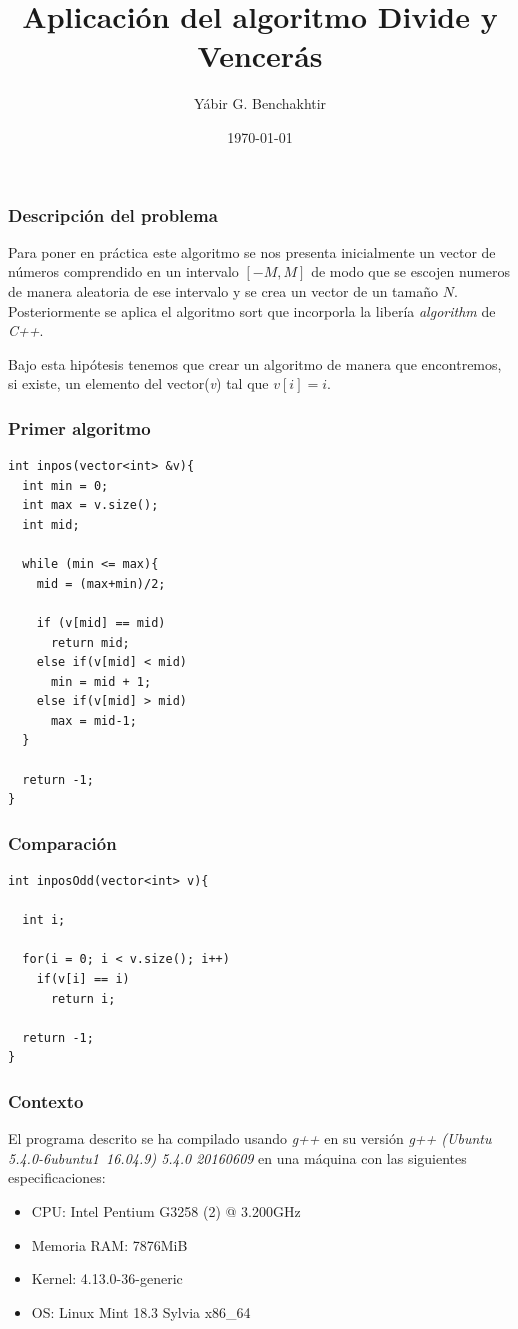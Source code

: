 \documentclass[spanish]{beamer}
\title{Aplicación del algoritmo Divide y Vencerás}
\date{\today}
\author{Yábir G. Benchakhtir}
\institute{Doble Grado en Ingeniería Informática y Matemáticas}
\begin{document}
\frame{\titlepage}

\begin{frame}\frametitle{Descripción del problema}

  Para poner en práctica este algoritmo se nos presenta inicialmente un
  vector de números comprendido en un intervalo $[-M, M]$ de modo que se
  escojen numeros de manera aleatoria de ese intervalo y se crea un
  vector de un tamaño $N$. Posteriormente se aplica el algoritmo sort
  que incorporla la libería \textit{algorithm} de \textit{C++}.

  Bajo esta hipótesis tenemos que crear un algoritmo de manera que
  encontremos, si existe, un elemento del vector(\textit{v}) tal que
  $v[i] = i$.

  
\end{frame}

\begin{frame}[fragile]\frametitle{Primer algoritmo}
\begin{lstlisting}
int inpos(vector<int> &v){
  int min = 0;
  int max = v.size();
  int mid;

  while (min <= max){
    mid = (max+min)/2;
    
    if (v[mid] == mid)
      return mid;
    else if(v[mid] < mid)
      min = mid + 1;
    else if(v[mid] > mid)
      max = mid-1; 
  }

  return -1;
}
\end{lstlisting}
\end{frame}

\begin{frame}[fragile]\frametitle{Comparación}

\begin{lstlisting}
int inposOdd(vector<int> v){

  int i;

  for(i = 0; i < v.size(); i++)
    if(v[i] == i)
      return i;

  return -1;
}
\end{lstlisting}
\end{frame}

\begin{frame}\frametitle{Contexto}

El programa descrito se ha compilado usando \textit{g++} en su versión
\textit{g++ (Ubuntu 5.4.0-6ubuntu1~16.04.9) 5.4.0 20160609} en una máquina con las siguientes especificaciones:


\begin{itemize}
\item CPU: Intel Pentium G3258 (2) @ 3.200GHz
\item Memoria RAM: 7876MiB
\item Kernel: 4.13.0-36-generic
\item OS: Linux Mint 18.3 Sylvia x86\_64
\end{itemize}

  
\end{frame}
\end{document}
